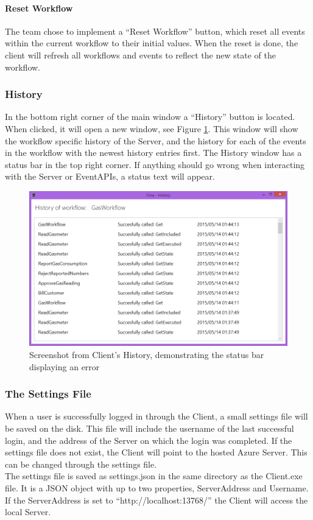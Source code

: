 \paragraph{Reset Workflow}
The team chose to implement a “Reset Workflow” button, which reset all events within the current workflow to their initial values. When the reset is done, the client will refresh all workflows and events to reflect the new state of the workflow.


\subsubsection{History}
In the bottom right corner of the main window a “History” button is located. When clicked, it will open a new window, see Figure \ref{fig:HistoryClient}. \newline
This window will show the workflow specific history of the Server, and the history for each of the events in the workflow with the newest history entries first. \newline
The History window has a status bar in the top right corner. If anything should go wrong when interacting with the Server or EventAPIs, a status text will appear.

\begin{figure}[h!]
\centering
\includegraphics[width=\linewidth]{Figures/HistoryWindow}
\caption{\label{fig:HistoryClient}Screenshot from Client's History, demonstrating the status bar displaying an error}
\end{figure}


\subsubsection{The Settings File \label{sec:SettingsFile}}
When a user is successfully logged in through the Client, a small settings file will be saved on the disk. This file will include the username of the last successful login, and the address of the Server on which the login was completed. If the settings file does not exist, the Client will point to the hosted Azure Server. This can be changed through the settings file. \\
The settings file is saved as settings.json in the same directory as the Client.exe file. It is a JSON object with up to two properties, ServerAddress and Username. If the ServerAddress is set to “http://localhost:13768/” the Client will access the local Server.